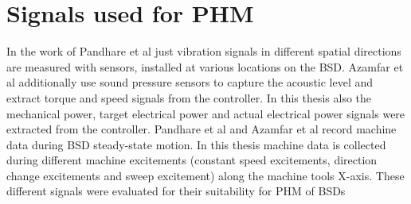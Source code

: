 \section{Signals used for PHM}
In the work of Pandhare et al \cite{Pandhare2021} just vibration signals in different spatial directions are measured with sensors, installed at various locations on the BSD. Azamfar et al \cite{AZAMFAR2020103932} additionally use sound pressure sensors to capture the acoustic level and extract torque and speed signals from the controller. In this thesis also the mechanical power, target electrical power and actual electrical power signals were extracted from the controller. Pandhare et al and Azamfar et al record machine data during BSD steady-state motion. In this thesis machine data is collected during different machine excitements (constant speed excitements, direction change excitements and sweep excitement) along the machine tools X-axis. These different signals were evaluated for their suitability for PHM of BSDs

\begin{comment}
Both Pandhare et al \cite{Pandhare2021} and Azamfar et al \cite{AZAMFAR2020103932} feed the data recorded during BSD steady-state motion as one single input to their models. During the phases of constant BSD motion, the amplitude of the signals changess. Azamfar et al assume that the shorter sequences created by a windowing function just capture limited information about these changes and are therefore not a proper tool for PHM \cite{AZAMFAR2020103932}. In the thesis a windowing function was evaluated for the PHM of BSDs. Windowing functions make the BSD experiments less dependent from specific BSD excitements. When beeing able to check the BSD degradation with short recorded windows, one can make statements about the BSD health status with data redcorded in real time use. Extra experiments 
\end{comment}

